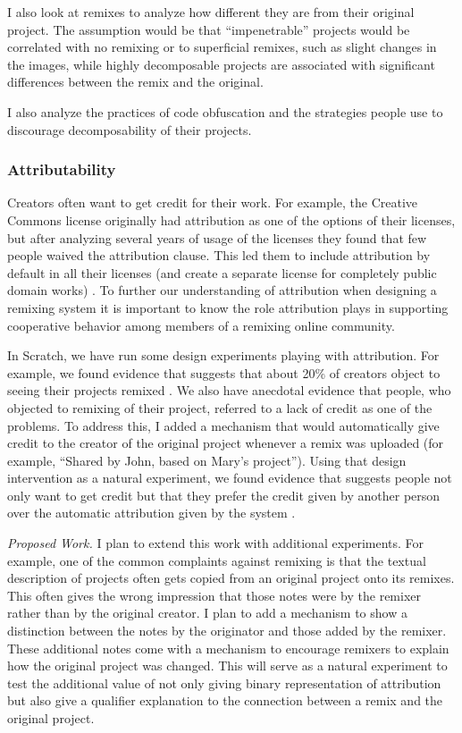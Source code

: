 I also look at remixes to analyze how different they are from their original project. 
The assumption would be that ``impenetrable'' projects would be correlated with no remixing or to superficial remixes, such as slight changes in the images, while highly decomposable projects are associated with significant differences between the remix and the original.

I also analyze the practices of code obfuscation and the strategies people use to discourage decomposability of their projects.

\subsubsection{Attributability}
Creators often want to get credit for their work. 
For example, the Creative Commons license originally had attribution as one of the options of their licenses, but after analyzing several years of usage of the licenses they found that few people waived the attribution clause. 
This led them to include attribution by default in all their licenses (and create a separate license for completely public domain works) \citep{brown_announcing_2004}.
To further our understanding of attribution when designing a remixing system it is important to know the role attribution plays in supporting cooperative behavior among members of a remixing online community.

In Scratch, we have run some design experiments playing with attribution. 
For example, we found evidence that suggests that about 20\% of creators object to seeing their projects remixed \citep{hill_responses_2010}.
We also have anecdotal evidence that people, who objected to remixing of their project, referred to a lack of credit as one of the problems.
To address this, I added a mechanism that would automatically give credit to the creator of the original project whenever a remix was uploaded (for example, ``Shared by John, based on Mary's project'').
Using that design intervention as a natural experiment, we found evidence that suggests people not only want to get credit but that they prefer the credit given by another person over the automatic attribution given by the system \cite{monroy-hernandez_computers_2011}. 

\emph{Proposed Work.}
I plan to extend this work with additional experiments.
For example, one of the common complaints against remixing is that the textual description of projects often gets copied from an original project onto its remixes.
This often gives the wrong impression that those notes were by the remixer rather than by the original creator.
I plan to add a mechanism to show a distinction between the notes by the originator and those added by the remixer.
These additional notes come with a mechanism to encourage remixers to explain how the original project was changed.
This will serve as a natural experiment to test the additional value of not only giving binary representation of attribution but also give a qualifier explanation to the connection between a remix and the original project.


